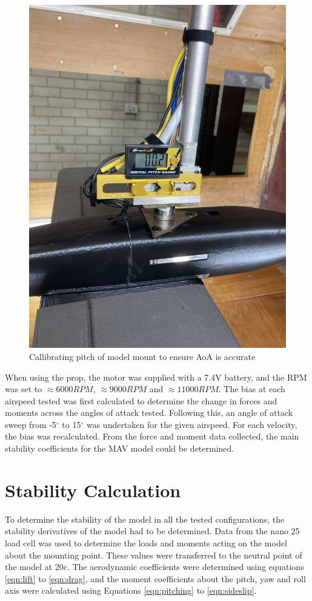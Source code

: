 \begin{figure}[H]
    \centering
    \includegraphics[scale=0.05]{04_Methodology/Figs/pitchGauge.jpg}
    \caption{Callibrating pitch of model mount to ensure \acrshort{AoA} is accurate}
    \label{fig:pitchGauge}
\end{figure}


When using the prop, the motor was supplied with a 7.4V battery, and the RPM was set to $\approx 6000 RPM$, $\approx 9000RPM$ and $\approx 11000 RPM$. The bias at each airspeed tested was first calculated to determine the change in forces and moments across the angles of attack tested. Following this, an angle of attack sweep from -5$^{\circ}$ to 15$^{\circ}$ was undertaken for the given airspeed. For each velocity, the bias was recalculated. From the force and moment data collected, the main stability coefficients for the MAV model could be determined.


\section{Stability Calculation}
To determine the stability of the model in all the tested configurations, the stability derivatives of the model had to be determined. Data from the nano 25 load cell was used to determine the loads and moments acting on the model about the mounting point. These values were transferred to the neutral point of the model at 20$\overline{c}$. The aerodynamic coefficients were determined using equations \ref{eqn:lift} to \ref{eqn:drag}, and the moment coefficients about the pitch, yaw and roll axis were calculated using Equations \ref{eqn:pitching} to \ref{eqn:sideslip}. 




